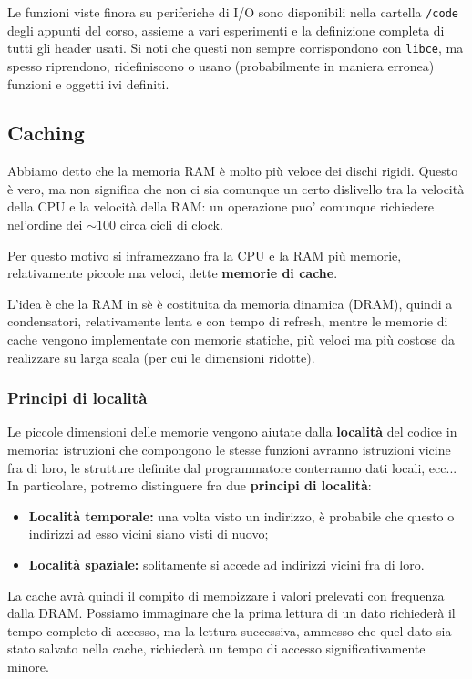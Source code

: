 \documentclass[a4paper,11pt]{article}
\begin{document}
Le funzioni viste finora su periferiche di I/O sono disponibili nella cartella \lstinline|/code| degli appunti del corso, assieme a vari esperimenti e la definizione completa di tutti gli header usati.
Si noti che questi non sempre corrispondono con \lstinline|libce|, ma spesso riprendono, ridefiniscono o usano (probabilmente in maniera erronea) funzioni e oggetti ivi definiti.

\subsection{Caching}
Abbiamo detto che la memoria RAM è molto più veloce dei dischi rigidi.
Questo è vero, ma non significa che non ci sia comunque un certo dislivello tra la velocità della CPU e la velocità della RAM: un operazione puo' comunque richiedere nel'ordine dei $\sim 100$ circa cicli di clock.

Per questo motivo si inframezzano fra la CPU e la RAM più memorie, relativamente piccole ma veloci, dette \textbf{memorie di cache}.

L'idea è che la RAM in sè è costituita da memoria dinamica (DRAM), quindi a condensatori, relativamente lenta e con tempo di refresh, mentre le memorie di cache vengono implementate con memorie statiche, più veloci ma più costose da realizzare su larga scala (per cui le dimensioni ridotte).

\subsubsection{Principi di località}
Le piccole dimensioni delle memorie vengono aiutate dalla \textbf{località} del codice in memoria: istruzioni che compongono le stesse funzioni avranno istruzioni vicine fra di loro, le strutture definite dal programmatore conterranno dati locali, ecc...
In particolare, potremo distinguere fra due \textbf{principi di località}:
\begin{itemize}
	\item \textbf{Località temporale:} una volta visto un indirizzo, è probabile che questo o indirizzi ad esso vicini siano visti di nuovo;
	\item \textbf{Località spaziale:} solitamente si accede ad indirizzi vicini fra di loro.
\end{itemize}

\par\smallskip

La cache avrà quindi il compito di memoizzare i valori prelevati con frequenza dalla DRAM.
Possiamo immaginare che la prima lettura di un dato richiederà il tempo completo di accesso, ma la lettura successiva, ammesso che quel dato sia stato salvato nella cache, richiederà un tempo di accesso significativamente minore.
\end{document}
